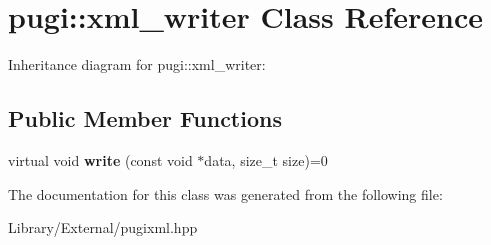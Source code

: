 \hypertarget{classpugi_1_1xml__writer}{}\section{pugi\+:\+:xml\+\_\+writer Class Reference}
\label{classpugi_1_1xml__writer}


Inheritance diagram for pugi\+:\+:xml\+\_\+writer\+:
\subsection*{Public Member Functions}
\begin{DoxyCompactItemize}
\item 
\hypertarget{classpugi_1_1xml__writer_ab7d3b6a8499ceef7799158370e1c2617}{}virtual void {\bfseries write} (const void $\ast$data, size\+\_\+t size)=0\label{classpugi_1_1xml__writer_ab7d3b6a8499ceef7799158370e1c2617}

\end{DoxyCompactItemize}


The documentation for this class was generated from the following file\+:\begin{DoxyCompactItemize}
\item 
Library/\+External/pugixml.\+hpp\end{DoxyCompactItemize}
